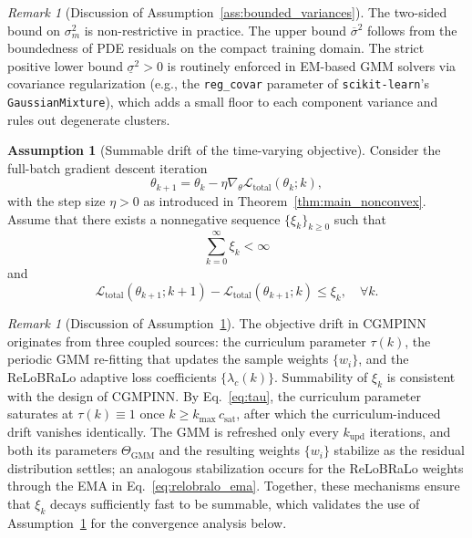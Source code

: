 \documentclass{article}
\theoremstyle{plain}
\theoremstyle{definition}
\newtheorem{assumption}[theorem]{Assumption}
\theoremstyle{remark}
\newtheorem{remark}[theorem]{Remark}
\begin{document}
\begin{remark}[Discussion of Assumption~\ref{ass:bounded_variances}]
	\label{rem:disc_variances}
	The two-sided bound on $\sigma_m^2$ is non-restrictive in practice.
	The upper bound $\overline{\sigma}^2$ follows from the boundedness of
	PDE residuals on the compact training domain.
	The strict positive lower bound $\underline{\sigma}^2>0$ is routinely
	enforced in EM-based GMM solvers via covariance regularization
	(e.g., the \texttt{reg\_covar} parameter of
	\texttt{scikit-learn}'s \texttt{GaussianMixture}), which adds a small
	floor to each component variance and rules out degenerate clusters.
\end{remark}

\begin{assumption}[Summable drift of the time-varying objective]
	\label{ass:summable_drift}
	Consider the full-batch gradient descent iteration
	\begin{equation}
		\theta_{k+1}
		=
		\theta_k
		-
		\eta \nabla_{\theta}\mathcal{L}_{\mathrm{total}}(\theta_k;k),
		\label{eq:app_gd_update}
	\end{equation}
	with the step size $\eta>0$ as introduced in
	Theorem~\ref{thm:main_nonconvex}.
	Assume that there exists a nonnegative sequence $\{\xi_k\}_{k\geqslant 0}$
	such that
	\begin{equation}
		\sum_{k=0}^{\infty}\xi_k<\infty
		\label{eq:app_summable_xi}
	\end{equation}
	and
	\begin{equation}
		\mathcal{L}_{\mathrm{total}}(\theta_{k+1};k+1)
		-
		\mathcal{L}_{\mathrm{total}}(\theta_{k+1};k)
		\leqslant
		\xi_k,
		\quad \forall k.
		\label{eq:app_drift_condition}
	\end{equation}
\end{assumption}

\begin{remark}[Discussion of Assumption~\ref{ass:summable_drift}]
	\label{rem:disc_drift}
	The objective drift in CGMPINN originates from three coupled sources:
	the curriculum parameter $\tau(k)$, the periodic GMM re-fitting that
	updates the sample weights $\{w_i\}$, and the ReLoBRaLo adaptive loss
	coefficients $\{\lambda_c(k)\}$.
	Summability of $\xi_k$ is consistent with the design of CGMPINN.
	By Eq.~\eqref{eq:tau}, the curriculum parameter saturates at
	$\tau(k)\equiv 1$ once $k\geqslant k_{\max}\,c_{\mathrm{sat}}$, after
	which the curriculum-induced drift vanishes identically.
	The GMM is refreshed only every $k_{\mathrm{upd}}$ iterations, and
	both its parameters $\Theta_{\mathrm{GMM}}$ and the resulting weights
	$\{w_i\}$ stabilize as the residual distribution settles; an analogous
	stabilization occurs for the ReLoBRaLo weights through the EMA in
	Eq.~\eqref{eq:relobralo_ema}.
	Together, these mechanisms ensure that $\xi_k$ decays sufficiently
	fast to be summable, which validates the use of
	Assumption~\ref{ass:summable_drift} for the convergence analysis below.
\end{remark}
\end{document}
